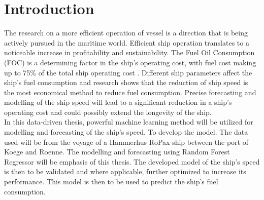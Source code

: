\section{Introduction} \label{introduction}

The research on a more efficient operation of vessel is a direction that is being actively pursued in the maritime world. 
Efficient ship operation translates to a noticeable increase in profitability and sustainability. 
The Fuel Oil Consumption (FOC) is a determining factor in the ship's operating cost, with fuel cost making up to 75\% of the total ship operating cost \cite{Abebe.2020,Gkerekos.2019}. 
Different ship parameters affect the ship's fuel consumption and research shows that the reduction of ship speed is the most economical method to reduce fuel consumption. 
Precise forecasting and modelling of the ship speed will lead to a significant reduction in a ship's operating cost and could possibly extend the longevity of the ship. \\

In this data-driven thesis, powerful machine learning method will be utilized for modelling and forecasting of the ship's speed. To develop the model. 
The data used will be from the voyage of a Hammerhus RoPax ship between the port of Koege and Roenne. 
The modelling and forecasting using Random Forest Regressor will be emphasis of this thesis. The developed model of the ship's speed is then to be validated and where applicable, 
further optimized to increase its performance. 
This model is then to be used to predict the ship's fuel consumption.




